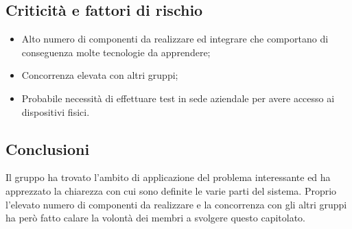 \subsection{Criticità e fattori di rischio}
\begin{itemize}
	\item Alto numero di componenti da realizzare ed integrare che comportano di conseguenza molte tecnologie da apprendere;
	\item Concorrenza elevata con altri gruppi;
	\item Probabile necessità di effettuare test in sede aziendale per avere accesso ai dispositivi fisici.
\end{itemize}
\subsection{Conclusioni}
Il gruppo ha trovato l'ambito di applicazione del problema interessante ed ha apprezzato la chiarezza con cui sono definite le varie parti del sistema. Proprio l'elevato numero di componenti da realizzare e la concorrenza con gli altri gruppi ha però fatto calare la volontà dei membri a svolgere questo capitolato\glo.
